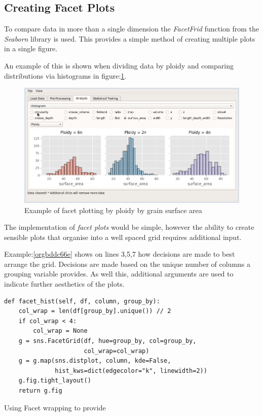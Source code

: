 \documentclass[11pt]{report}
\begin{document}
\clearpage
\subsection{Creating Facet Plots}
\label{sec:orgeddbee6}

To compare data in more than a single dimension the \emph{FacetFrid} function from the \emph{Seaborn} library is used. This provides a simple method of creating multiple plots in a single figure.

An example of this is shown when dividing data by ploidy and comparing distributions via histograms in figure:\ref{fig:org84f6b11}.

\begin{figure}[htbp]
\centering
\includegraphics[width=12cm]{./images/facet_example.png}
\caption{\label{fig:org84f6b11}
Example of facet plotting by ploidy by grain surface area}
\end{figure}

The implementation of \emph{facet plots} would be simple, however the ability to create sensible plots that organise into a well spaced grid requires additional input.

Example:\ref{orgbddc66e} shows on lines 3,5,7 how decisions are made to best arrange the grid. Decisions are made based on the unique number of columns a grouping variable provides. As well this,  additional arguments are  used to indicate further aesthetics of the plots.

\begin{listing}[htbp]
\begin{verbatim}
def facet_hist(self, df, column, group_by):
    col_wrap = len(df[group_by].unique()) // 2
    if col_wrap < 4:
        col_wrap = None
    g = sns.FacetGrid(df, hue=group_by, col=group_by,
                      col_wrap=col_wrap)
    g = g.map(sns.distplot, column, kde=False,
              hist_kws=dict(edgecolor="k", linewidth=2))
    g.fig.tight_layout()
    return g.fig
\end{verbatim}
\caption{\label{orgbddc66e}
Using Facet wrapping to provide}
\end{listing}
\end{document}
